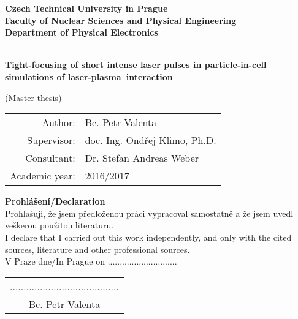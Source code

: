 \documentclass[12pt, twoside, a4paper, openright]{report}
\newcommand{\ctu}{Czech Technical University in Prague }
\newcommand{\fnspe}{Faculty of Nuclear Sciences and Physical Engineering }
\newcommand{\dpe}{Department of Physical Electronics }
\newcommand{\projecttitle}{Tight-focusing of short intense laser pulses in particle-in-cell simulations of laser-plasma~interaction }
\newcommand{\valenta}{Bc. Petr Valenta }
\newcommand{\klimo}{doc. Ing. Ondřej Klimo, Ph.D. }
\newcommand{\weber}{Dr. Stefan Andreas Weber }
\newcommand{\academicyear}{2016/2017 }
\begin{document}
\pagestyle{empty}



\begin{titlepage}

\begin{center}
{\Large \bf \ctu}\\[4mm]
{\Large \bf \fnspe}\\[4mm]
{\Large \bf \dpe}\\[16mm]
\epsfysize=45mm \\[12mm]
\begin{spacing}{2.0}
{\LARGE \bf \projecttitle}\\[2mm]
\end{spacing}
{\Large (Master thesis)} \\
\vfill
\end{center}

\begin{flushleft}
\begin{tabular}{rl}
Author: & \valenta \\[1mm]
Supervisor: & \klimo \\[1mm]
Consultant: & \weber \\[1mm]
Academic year: & \academicyear \\[1mm]
\end{tabular}
\end{flushleft}

\end{titlepage}


\newpage
\mbox{}


\newpage



\newpage



\newpage
\null
\vfill
{\bf \noindent Prohlášení/Declaration} \\[5mm]
Prohlašuji, že jsem předloženou práci vypracoval samostatně a že jsem uvedl veškerou
použitou literaturu.\\[2mm]
I declare that I carried out this work independently, and only with the cited sources, literature and other professional sources.\\
\vspace{5mm}V Praze dne/In Prague on .............................\hfill
\begin{tabular}{c}
........................................\\
\valenta
\end{tabular}
\end{document}
